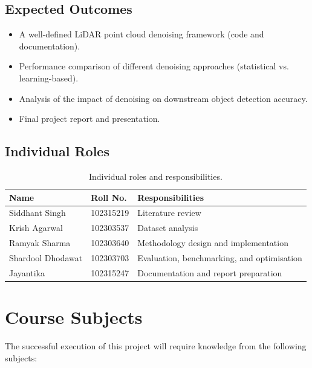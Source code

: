 \documentclass[12pt,a4paper]{article}
\begin{document}
\subsection*{Expected Outcomes}
\begin{itemize}
\item A well-defined LiDAR point cloud denoising framework (code and
      documentation).
\item Performance comparison of different denoising approaches (statistical
      vs. learning-based).
\item Analysis of the impact of denoising on downstream object detection
      accuracy.
\item Final project report and presentation.
\end{itemize}

\subsection*{Individual Roles}
\begin{table}[h]
\centering
\caption{Individual roles and responsibilities.}
\label{tab:roles}
\renewcommand{\arraystretch}{1.5}
\begin{tabular}{|p{4cm}|p{2.6cm}|p{6.4cm}|}
\hline
\textbf{Name} & \textbf{Roll No.} & \textbf{Responsibilities}\\\hline
Siddhant Singh & 102315219 & Literature review\\\hline
Krish Agarwal & 102303537 & Dataset analysis\\\hline
Ramyak Sharma & 102303640 & Methodology design and implementation\\\hline
Shardool Dhodawat & 102303703 & Evaluation, benchmarking, and optimisation\\\hline
Jayantika & 102315247 & Documentation and report preparation\\\hline
\end{tabular}
\end{table}
\clearpage

\section{Course Subjects}

The successful execution of this project will require knowledge from the
following subjects:
\end{document}
